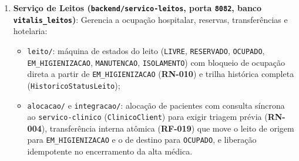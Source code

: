 \begin{enumerate}[leftmargin=*]
\begin{itemize}[noitemsep]
        \item \texttt{auditoria/}: gravação automática de eventos \texttt{LEITURA}, \texttt{CRIACAO} e \texttt{ALTERACAO} na tabela \texttt{auditoria\_acesso}, protegida por entidade \texttt{@Immutable} no Hibernate e gatilhos PostgreSQL que impedem \texttt{UPDATE}, \texttt{DELETE} e \texttt{TRUNCATE}.
    \end{itemize}

    \item \textbf{Serviço de Leitos (\texttt{backend/servico-leitos}, porta \texttt{8082}, banco \texttt{vitalis\_leitos})}:
    Gerencia a ocupação hospitalar, reservas, transferências e hotelaria:
    \begin{itemize}[noitemsep]
        \item \texttt{leito/}: máquina de estados do leito (\texttt{LIVRE}, \texttt{RESERVADO}, \texttt{OCUPADO}, \texttt{EM\_HIGIENIZACAO}, \texttt{MANUTENCAO}, \texttt{ISOLAMENTO}) com bloqueio de ocupação direta a partir de \texttt{EM\_HIGIENIZACAO} (\textbf{RN-010}) e trilha histórica completa (\texttt{HistoricoStatusLeito});
        \item \texttt{alocacao/} e \texttt{integracao/}: alocação de pacientes com consulta síncrona ao \texttt{servico-clinico} (\texttt{ClinicoClient}) para exigir triagem prévia (\textbf{RN-004}), transferência interna atômica (\textbf{RF-019}) que move o leito de origem para \texttt{EM\_HIGIENIZACAO} e o de destino para \texttt{OCUPADO}, e liberação idempotente no encerramento da alta médica.
    \end{itemize}


\end{enumerate}
